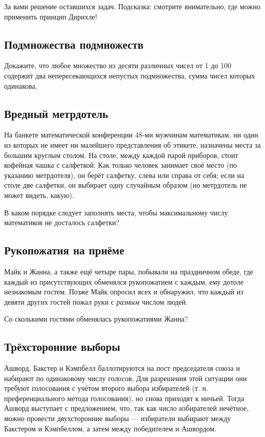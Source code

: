 \bigskip

За вами решение оставшихся задач.
Подсказка: смотрите внимательно, где можно применить принцип Дирихле!

\subsection*{Подмножества подмножеств}%

Докажите, что любое множество из десяти различных чисел от 1 до 100 содержит два непересекающихся непустых подмножества, сумма чисел которых одинакова.

\subsection*{Вредный метрдотель}%

На банкете математической конференции 48-ми мужчинам математикам, ни один из которых не имеет ни малейшего представления об этикете, назначены места за большим круглым столом.
На столе, между каждой парой приборов, стоит кофейная чашка с салфеткой.
Как только человек занимает своё место (по указанию метрдотеля), он берёт салфетку, слева или справа от себя; если на столе две салфетки, он выбирает одну случайным образом (но метрдотель не может видеть, какую).

В каком порядке следует заполнять места, чтобы максимальному числу математиков не досталось салфетки?

\subsection*{Рукопожатия на приёме}%

Майк и Жанна, а также ещё четыре пары, побывали на праздничном обеде, где каждый из присутствующих обменялся рукопожатием с каждым, ему дотоле незнакомым гостем.
Позже Майк опросил всех и обнаружил, что каждый из девяти других гостей пожал руки с \emph{разным} числом людей.

Со сколькими гостями обменялась рукопожатиями Жанна?

\subsection*{Трёхсторонние выборы}%

Ашворд, Бакстер и Кэмпбелл баллотируются на пост председателя союза %
и набирают по одинаковому числу голосов.
Для разрешения этой ситуации они требуют голосования с учётом второго выбора избирателей (т. н. преференциального метода голосования), но снова приходят к ничьей.
Тогда Ашворд выступает с предложением, что, так как число избирателей нечётное, можно провести двухсторонние выборы --- избиратели выбирают между Бакстером и Кэмпбеллом, а затем между победителем и Ашвордом.

